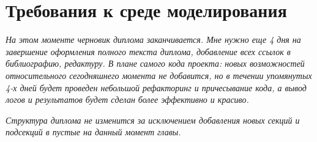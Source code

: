 \chapter{Требования к среде моделирования}

\textit{На этом моменте черновик диплома заканчивается. Мне нужно еще 4 дня на завершение оформления полного текста диплома, добавление всех ссылок в библиографию, редактуру. В плане самого кода проекта: новых возможностей относительного сегодняшнего момента не добавится, но в течении упомянутых 4-х дней будет проведен небольшой рефакторинг и причесывание кода, а вывод логов и результатов будет сделан более эффективно и красиво.}

\textit{Структура диплома не изменится за исключением добавления новых секций и подсекций в пустые на данный момент главы.}




